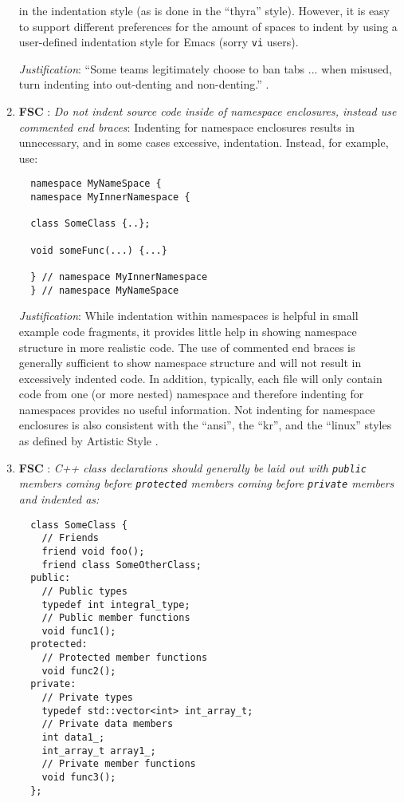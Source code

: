 \begin{enumerate}
in the indentation style (as is done in the ``thyra'' style).  However, it is
easy to support different preferences for the amount of spaces to indent by
using a user-defined indentation style for Emacs (sorry {}\texttt{vi} users).

{}\textit{Justification}: ``Some teams legitimately choose to ban tabs
... when misused, turn indenting into out-denting and non-denting.''
{}\cite[Item 0]{C++CodingStandards05}.

{}\item{}\textbf{FSC }:
{}\textit{Do not indent source code inside of namespace enclosures,
instead use commented end braces}: Indenting for namespace enclosures results
in unnecessary, and in some cases excessive, indentation.  Instead, for
example, use:

{\small\begin{verbatim}
  namespace MyNameSpace {
  namespace MyInnerNamespace {

  class SomeClass {..};

  void someFunc(...) {...}

  } // namespace MyInnerNamespace
  } // namespace MyNameSpace
\end{verbatim}}

{}\textit{Justification}: While indentation within namespaces is helpful in
small example code fragments, it provides little help in showing namespace
structure in more realistic code.  The use of commented end braces is
generally sufficient to show namespace structure and will not result in
excessively indented code.  In addition, typically, each file will only
contain code from one (or more nested) namespace and therefore indenting for
namespaces provides no useful information.  Not indenting for namespace
enclosures is also consistent with the ``ansi'', the ``kr'', and the ``linux''
styles as defined by Artistic Style {}\cite{ArtisticStyle}.

{}\item{}\textbf{FSC }:
{}\textit{C++ class declarations should generally be laid out with
{}\texttt{public} members coming before {}\texttt{protected} members coming
before {}\texttt{private} members and indented as:}

{\small\begin{verbatim}
  class SomeClass {
    // Friends
    friend void foo();
    friend class SomeOtherClass;
  public:
    // Public types
    typedef int integral_type;
    // Public member functions
    void func1();
  protected:
    // Protected member functions
    void func2();
  private:
    // Private types
    typedef std::vector<int> int_array_t;
    // Private data members
    int data1_;
    int_array_t array1_;
    // Private member functions
    void func3();
  };
\end{verbatim}}


\end{enumerate}
